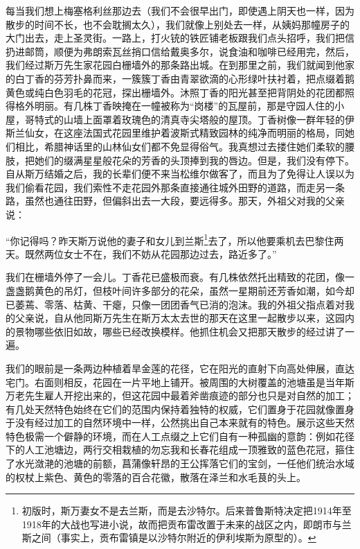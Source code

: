 \par 每当我们想上梅塞格利丝那边去（我们不会很早出门，即使遇上阴天也一样，因为散步的时间不长，也不会耽搁太久），我们就像上别处去一样，从姨妈那幢房子的大门出去，走上圣灵街。一路上，打火铳的铁匠铺老板跟我们点头招呼，我们把信扔进邮筒，顺便为弗朗索瓦丝捎口信给戴奥多尔，说食油和咖啡已经用完，然后，我们经过斯万先生家花园白栅墙外的那条路出城。在到那里之前，我们就闻到他家的白丁香的芬芳扑鼻而来，一簇簇丁香由青翠欲滴的心形绿叶扶衬着，把点缀着鹅黄色或纯白色羽毛的花冠，探出栅墙外。沐照丁香的阳光甚至把背阴处的花团都照得格外明丽。有几株丁香映掩在一幢被称为“岗楼”的瓦屋前，那是守园人住的小屋，哥特式的山墙上面罩着玫瑰色的清真寺尖塔般的屋顶。丁香树像一群年轻的伊斯兰仙女，在这座法国式花园里维护着波斯式精致园林的纯净而明丽的格局，同她们相比，希腊神话里的山林仙女们都不免显得俗气。我真想过去搂住她们柔软的腰肢，把她们的缀满星星般花朵的芳香的头顶捧到我的唇边。但是，我们没有停下。自从斯万结婚之后，我的长辈们便不来当松维尔做客了，而且为了免得让人误以为我们偷看花园，我们索性不走花园外那条直接通往城外田野的道路，而走另一条路，虽然也通往田野，但偏斜出去一大段，要远得多。那天，外祖父对我的父亲说：
\par “你记得吗？昨天斯万说他的妻子和女儿到兰斯\footnote{初版时，斯万妻女不是去兰斯，而是去沙特尔。后来普鲁斯特决定把1914年至1918年的大战也写进小说，故而把贡布雷改置于未来的战区之内，即朗市与兰斯之间（事实上，贡布雷镇是以沙特尔附近的伊利埃斯为原型的）。}去了，所以他要乘机去巴黎住两天。既然两位女士不在，我们不妨从花园那边过去，路近多了。”
\par 我们在栅墙外停了一会儿。丁香花已盛极而衰。有几株依然托出精致的花团，像一盏盏鹅黄色的吊灯，但枝叶间许多部分的花朵，虽然一星期前还芳香如潮，如今却已萎蔫、零落、枯黄、干瘪，只像一团团香气已消的泡沫。我的外祖父指点着对我的父亲说，自从他同斯万先生在斯万太太去世的那天在这里一起散步以来，这园内的景物哪些依旧如故，哪些已经改换模样。他抓住机会又把那天散步的经过讲了一遍。
\par 我们的眼前是一条两边种植着旱金莲的花径，它在阳光的直射下向高处伸展，直达宅门。右面则相反，花园在一片平地上铺开。被周围的大树覆盖的池塘虽是当年斯万老先生雇人开挖出来的，但这花园中最着斧凿痕迹的部分也只是对自然的加工；有几处天然特色始终在它们的范围内保持着独特的权威，它们置身于花园就像置身于没有经过加工的自然环境中一样，公然挑出自己本来就有的特色。展示这些天然特色极需一个僻静的环境，而在人工点缀之上它们自有一种孤幽的意韵：例如花径下的人工池塘边，两行交相栽植的勿忘我和长春花组成一顶雅致的蓝色花冠，箍住了水光潋滟的池塘的前额，菖蒲像轩昂的王公挥落它们的宝剑，一任他们统治水域的权杖上紫色、黄色的零落的百合花徽，散落在泽兰和水毛茛的头上。
